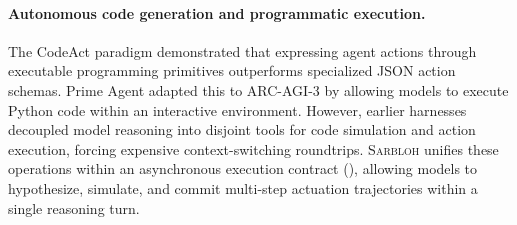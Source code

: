 \paragraph{Autonomous code generation and programmatic execution.}
The CodeAct paradigm \citep{wang2024codeact} demonstrated that expressing agent actions through executable programming primitives outperforms specialized JSON action schemas. Prime Agent \citep{karten2026prime} adapted this to ARC-AGI-3 by allowing models to execute Python code within an interactive environment. However, earlier harnesses decoupled model reasoning into disjoint tools for code simulation and action execution, forcing expensive context-switching roundtrips. \textsc{Sarbloh} unifies these operations within an asynchronous execution contract (), allowing models to hypothesize, simulate, and commit multi-step actuation trajectories within a single reasoning turn.

